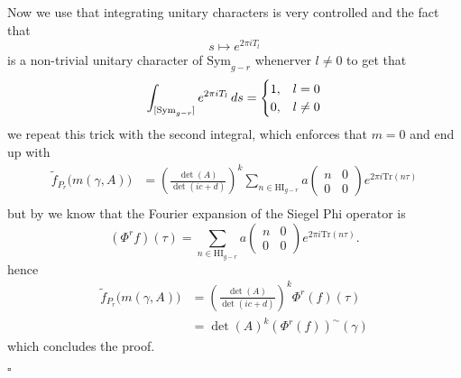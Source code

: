 Now we use that integrating unitary characters is very controlled  and the fact that 
\[s\mapsto  e^{2\pi iT_l} \]
is a non-trivial unitary character of \(\mathrm{Sym}_{g-r}\) whenerver \(l\neq 0\) to get that 
\[\int^{}_{[\mathrm{Sym}_{g-r}]}  e^{2\pi iT_l}  \,ds = \begin{cases}
    1, & l=0 \\
    0, & l\neq 0
\end{cases}\]
we repeat this trick with the second integral, which enforces that \(m = 0\) and end up with 
\begin{align*}
    \tilde f_{P_r}\bigl(m(\gamma, A)\bigr)
     &=\left(\frac{\det(A)}{\det(ic + d)}\right)^{k} \sum_{n\in\mathrm{HI}_{g-r}} a\begin{pmatrix} n & 0\\ 0 & 0 \end{pmatrix}e^{2\pi i \mathrm{Tr} (n\tau)}\\
\end{align*}
but by \cite[3.5]{bruinier123ModularForms2008} we know that the Fourier expansion of the Siegel Phi operator is 
\[(\Phi^{r} f)(\tau) = \sum_{n\in\mathrm{HI}_{g-r}} a\begin{pmatrix} n & 0\\ 0 & 0 \end{pmatrix} e^{2\pi i\mathrm{Tr}(n \tau)}.\]
hence 
\begin{align*}
    \tilde f_{P_r}\bigl(m(\gamma, A)\bigr)
     &=\left(\frac{\det(A)}{\det(ic + d)}\right)^{k} \Phi^r(f)(\tau)\\
     &= \det(A)^k (\Phi^r(f))^{\sim}(\gamma)
\end{align*}
which concludes the proof.
\begin{FlushRight}
     \(\square\)
\end{FlushRight}